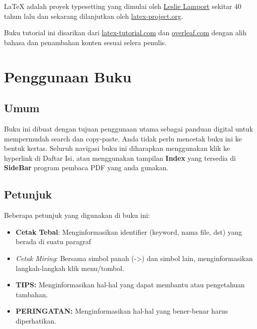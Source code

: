 \documentclass{book} %
\begin{document}
    LaTeX adalah proyek typesetting yang dimulai oleh \href{https://en.wikipedia.org/wiki/Leslie_Lamport}{Leslie Lamport}
    sekitar 40 tahun lalu dan sekarang dilanjutkan oleh \href{https://www.latex-project.org/}{latex-project.org}.

    \bigskip %

    Buku tutorial ini disarikan dari \href{https://latex-tutorial.com/tutorials}{latex-tutorial.com}
    dan \href{https://www.overleaf.com/learn/latex/Tutorials}{overleaf.com} dengan alih bahasa dan penambahan konten sesuai selera penulis.


	\newpage
	\chapter{Penggunaan Buku}

	\section{Umum} %
	Buku ini dibuat dengan tujuan penggunaan utama sebagai panduan digital untuk mempermudah search dan copy-paste.
	Anda tidak perlu mencetak buku ini ke bentuk kertas.
	Seluruh navigasi buku ini diharapkan menggunakan klik ke hyperlink di Daftar Isi,
	atau menggunakan tampilan \textbf{Index} yang tersedia di \textbf{SideBar} program pembaca PDF yang anda gunakan.

	\section{Petunjuk}
	Beberapa petunjuk yang digunakan di buku ini:
	\begin{itemize} %
		\item \textbf{Cetak Tebal}: Menginformasikan identifier (keyword, nama file, dst) yang berada di suatu paragraf
		\item \textit{Cetak Miring}: Bersama simbol panah (->) dan simbol lain, menginformasikan langkah-langkah klik menu/tombol.
		\item \textbf{TIPS:} Menginformasikan hal-hal yang dapat membantu atau pengetahuan tambahan.
		\item \textbf{PERINGATAN:} Menginformasikan hal-hal yang bener-benar harus diperhatikan.
	\end{itemize}
\end{document}
